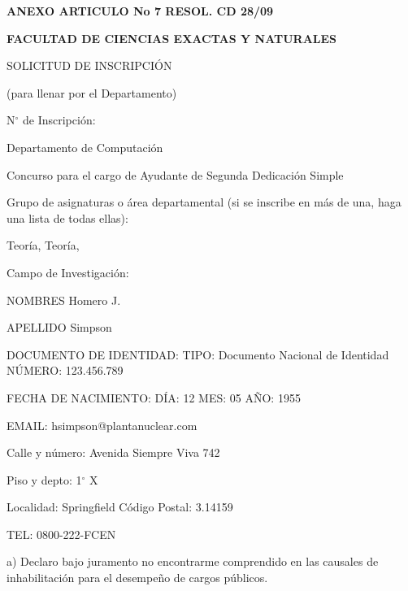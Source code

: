 \documentclass{article}
\newcommand{\cargo}[1]{\noindent Concurso para el cargo de {#1} \hspace{0.5cm} Dedicación Simple}
\newcommand{\areas}[3]{\noindent Grupo de asignaturas o área departamental (si se inscribe en más de una, haga una lista de todas ellas):

\medskip

\noindent {#1}\def\temp{#2}\ifx\temp\empty \else, {#2}\fi\def\temp{#3}\ifx\temp\empty \else, {#3} \fi}
\newcommand{\apellido}[1]{\noindent APELLIDO {#1}}
\newcommand{\nombre}[1]{\noindent NOMBRES {#1}}
\newcommand{\dni}[1]{\noindent DOCUMENTO DE IDENTIDAD:  TIPO: Documento Nacional de Identidad \hspace{0.25cm} NÚMERO: {#1}}
\newcommand{\fechaNacimiento}[3]{\noindent FECHA DE NACIMIENTO: DÍA: {#1} \hspace{0.1cm} MES: {#2} {\hspace{0.1cm}} AÑO: {#3}}
\newcommand{\domicilio}[5]{\noindent Calle y número: {#1}

\noindent Piso y depto: {#2}

\noindent Localidad: {#3} {\hspace{3cm}} Código Postal: {#4}

\noindent TEL: {#5}
}
\newcommand{\email}[1]{\noindent EMAIL: {#1}}
\newcommand{\legajo}[1]{\noindent NÚMERO DE LEGAJO: {#1}}
\begin{document}
\begin{center}
{\bf ANEXO ARTICULO No 7 RESOL. CD 28/09}
\end{center}
{\bf \noindent FACULTAD DE CIENCIAS EXACTAS Y NATURALES

\noindent SOLICITUD DE INSCRIPCIÓN}

\bigskip

\noindent (para llenar por el Departamento) 

\bigskip

\noindent N$^\circ$ de Inscripción: \hdashrule{4cm}{0.5pt}{0.75pt}

\medskip

\noindent Departamento de Computación

\cargo{Ayudante de Segunda}

\areas{Algoritmos}{Teoría}{}

\medskip

\noindent \hdashrule{\linewidth}{0.5pt}{0.75pt}

\noindent Campo de Investigación:

\medskip

\noindent \hdashrule{\linewidth}{0.5pt}{0.75pt}

\medskip

\noindent \hdashrule{\linewidth}{0.5pt}{0.75pt}

\medskip

\noindent \hrulefill

\bigskip

\nombre{Homero J.}

\medskip

\apellido{Simpson}

\medskip

\dni{123.456.789}

\medskip

\fechaNacimiento{12}{05}{1955}

\medskip

\email{hsimpson@plantanuclear.com}

% 

\bigskip

\domicilio{Avenida Siempre Viva 742}{1$^\circ$ X}{Springfield}{3.14159}{0800-222-FCEN}

\bigskip
\bigskip
\bigskip
\bigskip


\noindent a) Declaro bajo juramento no encontrarme comprendido en las causales
de inhabilitación para el desempeño de cargos públicos.
\end{document}
